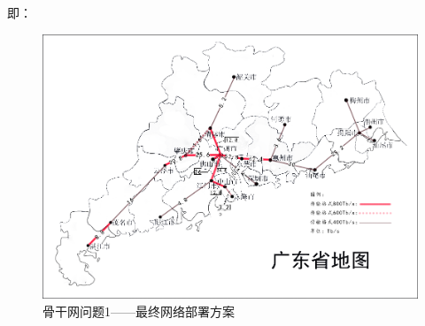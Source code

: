 \documentclass[UTF8,12pt]{ctexart}
\begin{document}
即：\par
\begin{figure}[H]
    \centering
    \includegraphics[scale=0.4]{overG1.png}   %
    \caption{骨干网问题1——最终网络部署方案}
\end{figure}
\end{document}
